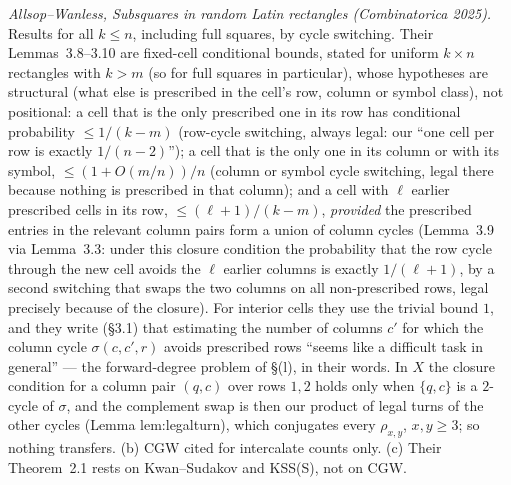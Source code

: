 \emph{Allsop--Wanless, Subsquares in random Latin rectangles
(Combinatorica 2025).}  Results for all $k\le n$, including full squares,
by cycle switching.  Their Lemmas~3.8--3.10 are fixed-cell conditional
bounds, stated for uniform $k\times n$ rectangles with $k>m$ (so for
full squares in particular), whose hypotheses are structural (what else
is prescribed in the cell's row, column or symbol class), not
positional: a cell that is the only prescribed one in its row
has conditional probability $\le1/(k-m)$ (row-cycle switching, always
legal: our ``one cell per row is exactly $1/(n-2)$''); a cell that is the
only one in its column or with its symbol, $\le(1+O(m/n))/n$ (column or
symbol cycle switching, legal there because nothing is prescribed in
that column); and a cell with $\ell$ earlier prescribed cells in its row,
$\le(\ell+1)/(k-m)$, \emph{provided} the prescribed entries in the
relevant column pairs form a union of column cycles (Lemma~3.9 via
Lemma~3.3: under this closure condition the probability that the row
cycle through the new cell avoids the $\ell$ earlier columns is exactly
$1/(\ell+1)$, by a second switching that swaps the two columns on all
non-prescribed rows, legal precisely because of the closure).  For
interior cells they use the trivial bound $1$, and they write (\S3.1) that
estimating the number of columns $c'$ for which the column cycle
$\sigma(c,c',r)$ avoids prescribed rows ``seems like a difficult task in
general'' --- the forward-degree problem of \S(l), in their words.  In $X$
the closure condition for a column pair $(q,c)$ over rows $1,2$ holds
only when $\{q,c\}$ is a $2$-cycle of $\sigma$, and the complement swap
is then our product of legal turns of the other cycles (Lemma lem:legalturn),
which conjugates every $\rho_{x,y}$, $x,y\ge3$; so nothing transfers.
(b) CGW cited for intercalate counts only.  (c) Their Theorem~2.1 rests
on Kwan--Sudakov and KSS(S), not on CGW.

